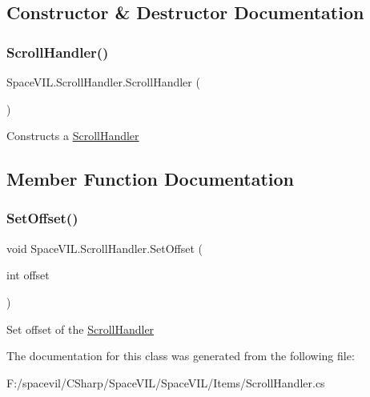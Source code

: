 \subsection{Constructor \& Destructor Documentation}
\mbox{\label{class_space_v_i_l_1_1_scroll_handler_a95452d5c586be5d21542dd743639cd62}} 
\subsubsection{\texorpdfstring{Scroll\+Handler()}{ScrollHandler()}}
{\footnotesize\ttfamily Space\+V\+I\+L.\+Scroll\+Handler.\+Scroll\+Handler (\begin{DoxyParamCaption}{ }\end{DoxyParamCaption})}



Constructs a \mbox{\hyperlink{class_space_v_i_l_1_1_scroll_handler}{Scroll\+Handler}} 



\subsection{Member Function Documentation}
\mbox{\label{class_space_v_i_l_1_1_scroll_handler_abce983699a4e1e947d6e6b8f91a97080}} 
\subsubsection{\texorpdfstring{Set\+Offset()}{SetOffset()}}
{\footnotesize\ttfamily void Space\+V\+I\+L.\+Scroll\+Handler.\+Set\+Offset (\begin{DoxyParamCaption}\item[{int}]{offset }\end{DoxyParamCaption})}



Set offset of the \mbox{\hyperlink{class_space_v_i_l_1_1_scroll_handler}{Scroll\+Handler}} 



The documentation for this class was generated from the following file\+:\begin{DoxyCompactItemize}
\item 
F\+:/spacevil/\+C\+Sharp/\+Space\+V\+I\+L/\+Space\+V\+I\+L/\+Items/Scroll\+Handler.\+cs\end{DoxyCompactItemize}
